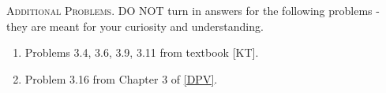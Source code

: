 \documentclass[11pt]{article}
\begin{document}
\textsc{Additional Problems}. DO NOT turn in answers for the following problems - they are meant for your curiosity and understanding.
\begin{enumerate}
\item Problems 3.4, 3.6, 3.9, 3.11 from textbook [KT].
\item Problem 3.16 from Chapter 3 of \href{https://people.eecs.berkeley.edu/~vazirani/algorithms/chap3.pdf}{[DPV]}.
\end{enumerate}
\end{document}
